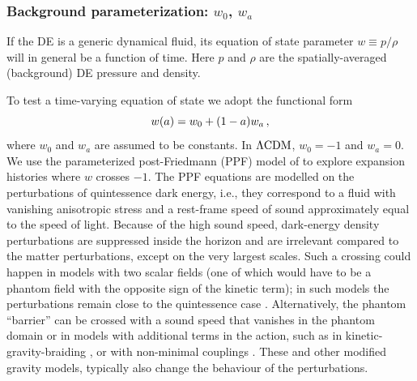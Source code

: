\documentclass[longauth,traditabstract]{aa}
\def\,{\thinspace}
\providecommand{\LCDM}{{$\rm{\Lambda CDM}$}}
\begin{document}
\subsubsection{Background parameterization: \texorpdfstring{$w_0$, $w_a$}{w₀,wₐ}}
\label{sec:w0wa}

If the DE is a generic dynamical fluid, its equation of state
parameter $w \equiv p/\rho$ will in general be a function of time.
 Here $p$ and $\rho$ are the
spatially-averaged (background) DE pressure and density.

To test a time-varying equation of state we adopt the functional form
\begin{equation} \label{w0wapar}
w(a) = w_0 + (1-a) w_a \, ,
\end{equation}
where $w_0$ and $w_a$ are assumed to be constants. In \LCDM, $w_0 = -1$ and $w_a=0$.
We use the parameterized post-Friedmann (PPF) model of \cite{Fang:2008sn}
to explore expansion histories where $w$ crosses $-1$.
The PPF equations are modelled on the perturbations of quintessence dark energy, i.e., they correspond
to a fluid with vanishing anisotropic stress and a rest-frame speed of sound approximately equal to the speed of light.
Because of the high sound speed, dark-energy density perturbations are suppressed inside the horizon and are irrelevant
compared to the matter perturbations, except on the very largest scales.
 Such a crossing could happen in models with two scalar fields (one of which would have to be a phantom field with the opposite sign of the kinetic term); in such models
the perturbations remain close to the quintessence case \citep[see e.g.,][]{Kunz:2006wc}. Alternatively,
the phantom ``barrier'' can be crossed with a sound speed that vanishes in the phantom domain \citep{Creminelli:2008wc}
or in models with additional terms in the action, such as in kinetic-gravity-braiding \citep{Deffayet:2010qz}, or with non-minimal couplings \citep{Amendola:1999er, Pettorino:2008ez}. These and other modified gravity models, typically also change the behaviour of
the perturbations.
\end{document}
